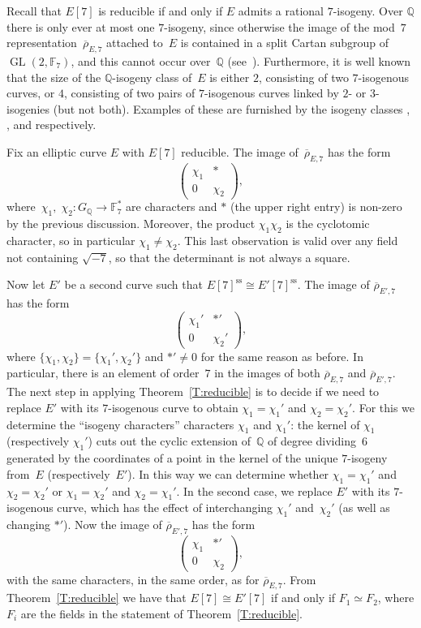 \documentclass[12pt, reqno]{amsart}
\newcommand{\lmfdbeciso}[2]{\href{http://www.lmfdb.org/EllipticCurve/Q/#1/#2}{\text{\rm#1#2}}}
\newcommand{\F}{\mathbb{F}}
\newcommand{\Q}{\mathbb{Q}}
\newcommand{\rhobar}{{\overline{\rho}}}
\DeclareMathOperator{\sss}{ss}
\newcommand{\GL}{\operatorname{GL}}
\numberwithin{equation}{section}
\theoremstyle{definition}
\theoremstyle{remark}
\begin{document}
Recall that $E[7]$ is reducible if and only if $E$ admits a rational
$7$-isogeny.  Over $\Q$ there is only ever at most one $7$-isogeny,
since otherwise the image of the mod~$7$
representation~$\rhobar_{E,7}$ attached to~$E$ is contained in a split
Cartan subgroup of $\GL(2,\F_7)$, and this cannot occur over~$\Q$
(see~\cite[Theorem~1.1]{GL}).  Furthermore, it is well known that the
size of the $\Q$-isogeny class of~$E$ is either $2$, consisting of two
$7$-isogenous curves, or $4$, consisting of two pairs of $7$-isogenous
curves linked by $2$-{} or $3$-isogenies (but not both). Examples of
these are furnished by the isogeny classes \lmfdbeciso{26}{b},
\lmfdbeciso{49}{a}, and \lmfdbeciso{162}{b} respectively.

Fix an elliptic curve $E$ with $E[7]$ reducible. 
The image
of~$\rhobar_{E,7}$ has the form
\[
  \begin{pmatrix}\chi_1&*\\0&\chi_2  \end{pmatrix},
\]
where~$\chi_1, \; \chi_2 : G_{\Q}\to\F_7^*$ are characters and $*$
(the upper right entry) is non-zero by the previous
discussion. Moreover, the product $\chi_1\chi_2$ is the cyclotomic
character, so in particular $\chi_1\not=\chi_2$. This last observation
is valid over any field not containing $\sqrt{-7}$, so that the
determinant is not always a square.

Now let $E'$ be a second curve such that $E[7]^{\sss}\cong
E'[7]^{\sss}$. 
The image of $\rhobar_{E',7}$ has the form
\[
  \begin{pmatrix}\chi_1'&*'\\0&\chi_2'  \end{pmatrix},
  \]
where $\{\chi_1,\chi_2\}=\{\chi_1',\chi_2'\}$ and $*' \neq 0$ for the
same reason as before.  In particular, there is an element of
order~$7$ in the images of both $\rhobar_{E,7}$ and $\rhobar_{E',7}$.
The next step in applying Theorem~\ref{T:reducible} is to decide if we
need to replace $E'$ with its $7$-isogenous curve to obtain
$\chi_1=\chi_1'$ and $\chi_2=\chi_2'$. For this we determine the
``isogeny characters'' characters $\chi_1$ and $\chi_1'$: the kernel
of $\chi_1$ (respectively $\chi_1'$) cuts out the cyclic extension
of~$\Q$ of degree dividing~$6$ generated by the coordinates of a point
in the kernel of the unique $7$-isogeny from~$E$ (respectively~$E'$).
In this way we can determine whether $\chi_1=\chi_1'$ and
$\chi_2=\chi_2'$ or $\chi_1=\chi_2'$ and $\chi_2=\chi_1'$.  In the
second case, we replace $E'$ with its $7$-isogenous curve, which has
the effect of interchanging $\chi_1'$ and~$\chi_2'$ (as well as
changing $*'$).  Now the image of $\rhobar_{E',7}$ has the form
\[
\begin{pmatrix}\chi_1&*'\\0&\chi_2  \end{pmatrix},
\]
with the same characters, in the same order, as for
$\rhobar_{E,7}$. From Theorem~\ref{T:reducible} we have that
$E[7]\cong E'[7]$ if and only if $F_1 \simeq F_2$, where $F_i$ are the
fields in the statement of Theorem~\ref{T:reducible}.
\end{document}
